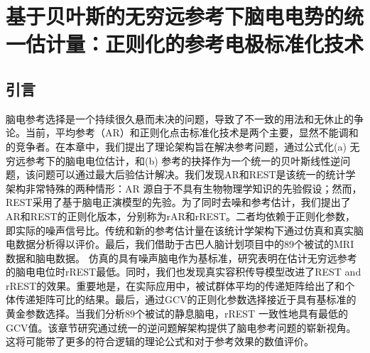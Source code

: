 \chapter{基于贝叶斯的无穷远参考下脑电电势的统一估计量：正则化的参考电极标准化技术}
\section{引言}
脑电参考选择是一个持续很久悬而未决的问题，导致了不一致的用法和无休止的争论。当前，平均参考（AR）和正则化点击标准化技术是两个主要，显然不能调和的竞争者。在本章中，我们提出了理论架构旨在解决参考问题，通过公式化(a) 无穷远参考下的脑电电位估计，和(b) 参考的抉择作为一个统一的贝叶斯线性逆问题，该问题可以通过最大后验估计解决。我们发现AR和REST是该统一的统计学架构非常特殊的两种情形：AR 源自于不具有生物物理学知识的先验假设；然而，REST采用了基于脑电正演模型的先验。为了同时去噪和参考估计，我们提出了AR和REST的正则化版本，分别称为rAR和rREST。二者均依赖于正则化参数，即实际的噪声信号比。传统和新的参考估计量在该统计学架构下通过仿真和真实脑电数据分析得以评价。最后，我们借助于古巴人脑计划项目中的89个被试的MRI数据和脑电数据。 仿真的具有噪声脑电作为基标准，研究表明在估计无穷远参考的脑电电位时rREST最低。同时，我们也发现真实容积传导模型改进了REST and rREST的效果。重要地是，在实际应用中，被试群体平均的传递矩阵给出了和个体传递矩阵可比的结果。最后，通过GCV的正则化参数选择接近于具有基标准的黄金参数选择。当我们分析89个被试的静息脑电，rREST 一致性地具有最低的GCV值。该章节研究通过统一的逆问题解架构提供了脑电参考问题的崭新视角。 这将可能带了更多的符合逻辑的理论公式和对于参考效果的数值评价。
